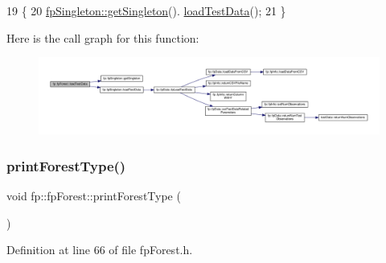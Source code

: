 \begin{DoxyCode}
19                                \{
20                 \hyperlink{classfp_1_1fpSingleton_a8bdae77b68521003e3fc630edec2e240}{fpSingleton::getSingleton}().
      \hyperlink{classfp_1_1fpSingleton_aea7c3b65ded387322d7d5ce48ab96215}{loadTestData}();
21             \}
\end{DoxyCode}
Here is the call graph for this function\+:\nopagebreak
\begin{figure}[H]
\begin{center}
\leavevmode
\includegraphics[width=350pt]{classfp_1_1fpForest_abdcf008b65b6af7be5428d838b33be32_cgraph}
\end{center}
\end{figure}
\mbox{\label{classfp_1_1fpForest_a4a7ffa92224570d6a97eff8bd5e9b0fa}} 
\subsubsection{\texorpdfstring{print\+Forest\+Type()}{printForestType()}}
{\footnotesize\ttfamily void fp\+::fp\+Forest\+::print\+Forest\+Type (\begin{DoxyParamCaption}{ }\end{DoxyParamCaption})\hspace{0.3cm}{\ttfamily [inline]}}



Definition at line 66 of file fp\+Forest.\+h.


